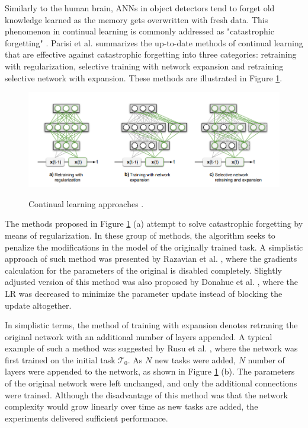 Similarly to the human brain, ANNs in object detectors tend to forget old knowledge learned as the memory gets overwritten with fresh data. This phenomenon in continual learning is commonly addressed as "catastrophic forgetting" \cite{Parisi2018}. Parisi et al. summarizes the up-to-date methods of continual learning that are effective against catastrophic forgetting into three categories: retraining with regularization, selective training with network expansion and retraining selective network with expansion. These methods are illustrated in Figure \ref{continual}. 

\begin{figure}[htb]
	\begin{center}
		\includegraphics[width=16cm]{./continual.png}
	\end{center}
	\caption{Continual learning approaches
\cite{Parisi2018}.}
	\begin{center}
		\label{continual}
	\end{center}
\end{figure}

The methods proposed in Figure \ref{continual} (a) attempt to solve catastrophic forgetting by means of regularization. In these group of methods, the algorithm seeks to penalize the modifications in the model of the originally trained task. A simplistic approach of such method was presented by Razavian et al.  \cite{Razavian2014}, where the gradients calculation for the parameters of the original is disabled completely. Slightly adjusted version of this method was also proposed by Donahue et al. \cite{Donahue2013}, where the LR was decreased to minimize the parameter update instead of blocking the update altogether. 


In simplistic terms, the method of training with expansion denotes retraning the original network with an additional number of layers appended. A typical example of such a method was suggested by Rusu et al. \cite{Rusu2016}, where the network was first trained on the initial task $\mathcal{T}_0 $. As $N$ new tasks were added, $N$ number of layers were appended to the network, as shown in Figure \ref{continual} (b). The parameters of the original network were left unchanged, and only the additional connections were trained. Although the disadvantage of this method was that the network complexity would grow linearly over time as new tasks are added, the experiments delivered sufficient performance. 

